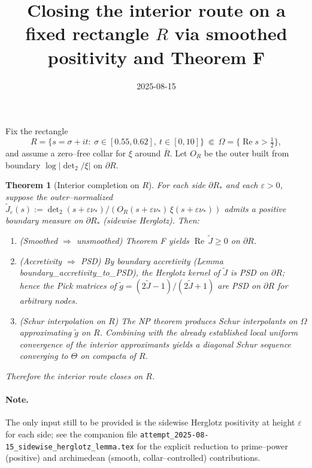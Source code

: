 \documentclass[11pt]{article}
\title{Closing the interior route on a fixed rectangle $R$ via smoothed positivity and Theorem F}
\date{2025-08-15}
\newtheorem{theorem}{Theorem}
\theoremstyle{remark}
\newcommand{\ReS}{\operatorname{Re}}
\begin{document}
\maketitle

Fix the rectangle
\[
R=\{ s=\sigma+it:\ \sigma\in[0.55,0.62],\ t\in[0,10]\}\ \Subset\ \Omega=\{\ReS s>\tfrac12\},
\]
and assume a zero--free collar for $\xi$ around $\overline R$. Let $O_R$ be the outer built from boundary $\log|\det_2/\xi|$ on $\partial R$.

\begin{theorem}[Interior completion on $R$]
For each side $\partial R_*$ and each $\varepsilon>0$, suppose the outer--normalized $\widetilde J_\varepsilon(s):=\det_2(s+\varepsilon\nu_*)/(O_R(s+\varepsilon\nu_*)\,\xi(s+\varepsilon\nu_*))$ admits a positive boundary measure on $\partial R_*$ (sidewise Herglotz). Then:
\begin{enumerate}
  \item (Smoothed \(\Rightarrow\) unsmoothed) Theorem F yields $\ReS\,\widetilde J\ge0$ on $\partial R$.
  \item (Accretivity \(\Rightarrow\) PSD) By boundary accretivity (Lemma boundary\_accretivity\_to\_PSD), the Herglotz kernel of $\widetilde J$ is PSD on $\partial R$; hence the Pick matrices of $\widetilde g=(2\widetilde J-1)/(2\widetilde J+1)$ are PSD on $\partial R$ for arbitrary nodes.
  \item (Schur interpolation on $R$) The NP theorem produces Schur interpolants on $\Omega$ approximating $\widetilde g$ on $R$. Combining with the already established local uniform convergence of the interior approximants yields a diagonal Schur sequence converging to $\Theta$ on compacta of $R$.
\end{enumerate}
Therefore the interior route closes on $R$.
\end{theorem}

\paragraph{Note.} The only input still to be provided is the sidewise Herglotz positivity at height $\varepsilon$ for each side; see the companion file \texttt{attempt\_2025-08-15\_sidewise\_herglotz\_lemma.tex} for the explicit reduction to prime--power (positive) and archimedean (smooth, collar--controlled) contributions.
\end{document}
